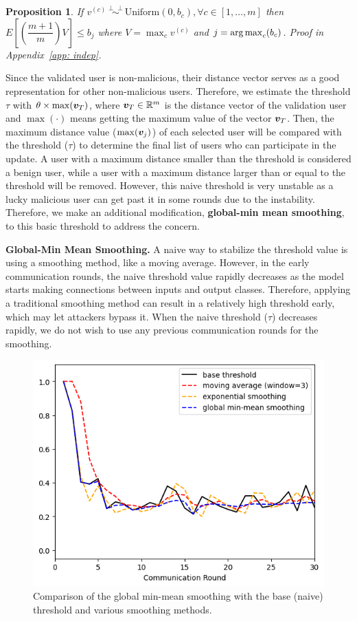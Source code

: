 \documentclass{article} %
\newtheorem{prop}{Proposition}
\newcommand{\indep}{\perp \!\!\! \perp}
\begin{document}
\vspace{-5pt}
\begin{prop}
\label{prop: indep}
    If $v^{(c)} \overset{\indep}{\sim} \text{Uniform}(0, b_c), \forall c \in [1, \ldots, m]$ then $E \left[ \left( \dfrac{m + 1}{m} \right) V \right] \leq b_j$ where $V = \max_c v^{(c)}$ and $j = \operatorname*{arg\,max}_c(b_c)$. Proof in Appendix~\ref{app: indep}.
\end{prop}
\vspace{-5pt}

Since the validated user is non-malicious, their distance vector serves as a good representation for other non-malicious users. Therefore, we estimate the threshold $\tau$ with $\theta\times\max({\bm{v}}_T)$, where ${\bm{v}}_T\in{\mathbb{R}}^m$ is the distance vector of the validation user and $\max(\cdot)$ means getting the maximum value of the vector ${\bm{v}}_T$. Then, the maximum distance value ($\max({\bm{v}}_j)$) of each selected user will be compared with the threshold ($\tau$) to determine the final list of users who can participate in the update. A user with a maximum distance smaller than the threshold is considered a benign user, while a user with a maximum distance larger than or equal to the threshold will be removed. However, this naive threshold is very unstable as a lucky malicious user can get past it in some rounds due to the instability. Therefore, we make an additional modification, {\bf global-min mean smoothing}, to this basic threshold to address the concern.


\textbf{Global-Min Mean Smoothing.} A naive way to stabilize the threshold value is using a smoothing method, like a moving average. However, in the early communication rounds, the naive threshold value rapidly decreases as the model starts making connections between inputs and output classes. Therefore, applying a traditional smoothing method can result in a relatively high threshold early, which may let attackers bypass it. When the naive threshold ($\tau$) decreases rapidly, we do not wish to use any previous communication rounds for the smoothing. 

\begin{figure}
\vspace{-5pt}
    \includegraphics[width=.4\textwidth]{make_article/make_visuals/visuals/smoothing--d_rounds30.png}
    \vspace{-10pt}
    \caption{\footnotesize Comparison of the global min-mean smoothing with the base (naive) threshold and various smoothing methods. 
    }
    \label{fig: smoothing}
\end{figure}
\end{document}
